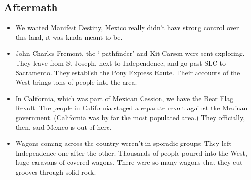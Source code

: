 \documentclass{article}
\begin{document}
  \subsection{Aftermath}
    \begin{itemize}
      \item We wanted Manifest Destiny, Mexico really didn't have strong control over this land, it was kinda meant to be. 
      \item John Charles Fremont, the ` pathfinder' and Kit Carson were sent exploring. They leave from St Joseph, next to Independence, and go past SLC to Sacramento. They establish the Pony Express Route. Their accounts of the West brings tons of people into the area. 
      \item In California, which was part of Mexican Cession, we have the Bear Flag Revolt: The people in California staged a separate revolt against the Mexican government. (California was by far the most populated area.) They officially, then, said Mexico is out of here. 
      \item Wagons coming across the country weren't in sporadic groups: They left Independence one after the other. Thousands of people poured into the West, huge caravans of covered wagons. There were so many wagons that they cut grooves through solid rock.
    \end{itemize}
\end{document}
